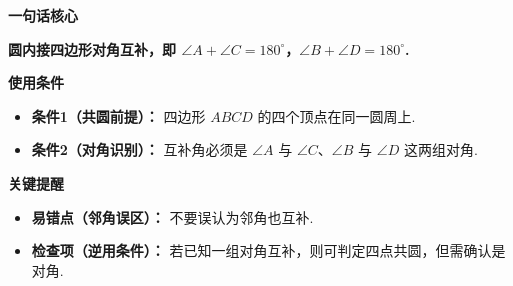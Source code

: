 \begin{summarybox}
	\textbf{\textcolor{CSummary}{一句话核心}}

	\textbf{圆内接四边形对角互补，即 $\angle A+\angle C=180^\circ$，$\angle B+\angle D=180^\circ$.}

	\medskip
	\textbf{\textcolor{CSummary}{使用条件}}
	\begin{itemize}[leftmargin=*, itemsep=0.5em, topsep=0.4em]
		\item \textbf{条件1（共圆前提）：} 四边形 $ABCD$ 的四个顶点在同一圆周上.
		\item \textbf{条件2（对角识别）：} 互补角必须是 $\angle A$ 与 $\angle C$、$\angle B$ 与 $\angle D$ 这两组对角.
	\end{itemize}

	\medskip
	\textbf{\textcolor{CSummary}{关键提醒}}
	\begin{itemize}[leftmargin=*, itemsep=0.5em, topsep=0.4em]
		\item \textbf{易错点（邻角误区）：} 不要误认为邻角也互补.
		\item \textbf{检查项（逆用条件）：} 若已知一组对角互补，则可判定四点共圆，但需确认是对角.
	\end{itemize}
\end{summarybox}
